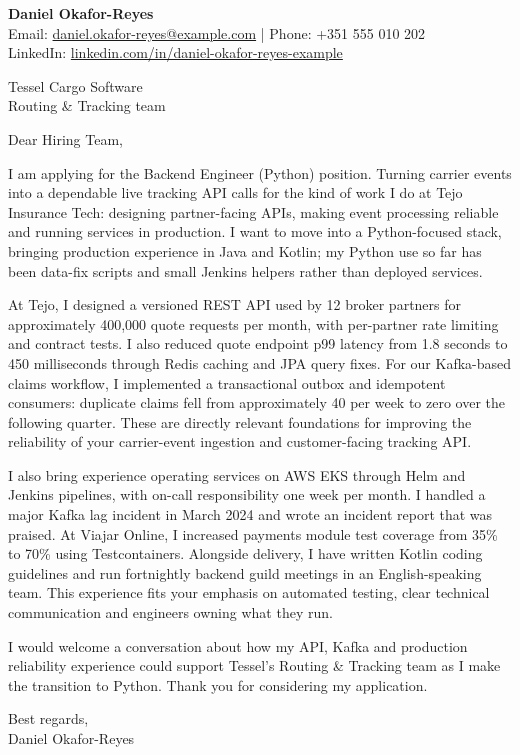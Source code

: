 \documentclass[11pt,a4paper]{article}
\begin{document}
{\Large\bfseries\color{primarycolor} Daniel Okafor-Reyes}\\
{\small Email: \href{mailto:daniel.okafor-reyes@example.com}{daniel.okafor-reyes@example.com} | Phone: +351 555 010 202\\
LinkedIn: \href{https://linkedin.com/in/daniel-okafor-reyes-example}{linkedin.com/in/daniel-okafor-reyes-example}}

Tessel Cargo Software\\
Routing \& Tracking team

Dear Hiring Team,

I am applying for the Backend Engineer (Python) position. Turning carrier events into a dependable live tracking API calls for the kind of work I do at Tejo Insurance Tech: designing partner-facing APIs, making event processing reliable and running services in production. I want to move into a Python-focused stack, bringing production experience in Java and Kotlin; my Python use so far has been data-fix scripts and small Jenkins helpers rather than deployed services.

At Tejo, I designed a versioned REST API used by 12 broker partners for approximately 400,000 quote requests per month, with per-partner rate limiting and contract tests. I also reduced quote endpoint p99 latency from 1.8 seconds to 450 milliseconds through Redis caching and JPA query fixes. For our Kafka-based claims workflow, I implemented a transactional outbox and idempotent consumers: duplicate claims fell from approximately 40 per week to zero over the following quarter. These are directly relevant foundations for improving the reliability of your carrier-event ingestion and customer-facing tracking API.

I also bring experience operating services on AWS EKS through Helm and Jenkins pipelines, with on-call responsibility one week per month. I handled a major Kafka lag incident in March 2024 and wrote an incident report that was praised. At Viajar Online, I increased payments module test coverage from 35\% to 70\% using Testcontainers. Alongside delivery, I have written Kotlin coding guidelines and run fortnightly backend guild meetings in an English-speaking team. This experience fits your emphasis on automated testing, clear technical communication and engineers owning what they run.

I would welcome a conversation about how my API, Kafka and production reliability experience could support Tessel's Routing \& Tracking team as I make the transition to Python. Thank you for considering my application.

Best regards,\\
Daniel Okafor-Reyes
\end{document}
